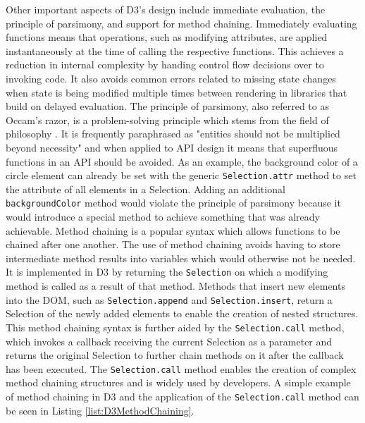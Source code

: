 Other important aspects of D3's design include immediate evaluation, the principle of parsimony, and support for method chaining.
Immediately evaluating functions means that operations, such as modifying attributes, are applied instantaneously at the time of calling the respective functions.
This achieves a reduction in internal complexity by handing control flow decisions over to invoking code.
It also avoids common errors related to missing state changes when state is being modified multiple times between rendering in libraries that build on delayed evaluation.
The principle of parsimony, also referred to as Occam's razor, is a problem-solving principle which stems from the field of philosophy \parencite{PrincipleOfParsimony}.
It is frequently paraphrased as "entities should not be multiplied beyond necessity" and when applied to API design it means that superfluous functions in an API should be avoided.
As an example, the background color of a circle element can already be set with the generic \lstinline{Selection.attr} method to set the  attribute of all elements in a Selection.
Adding an additional \lstinline{backgroundColor} method would violate the principle of parsimony because it would introduce a special method to achieve something that was already achievable.
Method chaining is a popular syntax which allows functions to be chained after one another.
The use of method chaining avoids having to store intermediate method results into variables which would otherwise not be needed.
It is implemented in D3 by returning the \lstinline{Selection} on which a modifying method is called as a result of that method.
Methods that insert new elements into the DOM, such as \lstinline{Selection.append} and \lstinline{Selection.insert}, return a Selection of the newly added elements to enable the creation of nested structures.
This method chaining syntax is further aided by the \lstinline{Selection.call} method, which invokes a callback receiving the current Selection as a parameter and returns the original Selection to further chain methods on it after the callback has been executed.
The \lstinline{Selection.call} method enables the creation of complex method chaining structures and is widely used by developers.
A simple example of method chaining in D3 and the application of the \lstinline{Selection.call} method can be seen in Listing \ref{list:D3MethodChaining}.

\begin{samepage}
 
    A simple example of method chaining in D3 which creates an  and  element inside a .
  },
]{listings/d3-method-chaining.js}
\end{samepage}

